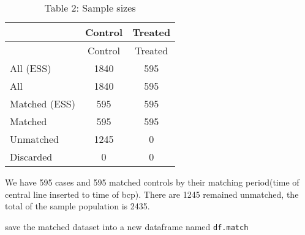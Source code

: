 \documentclass[
]{article}
\newenvironment{Shaded}{\begin{snugshade}}{\end{snugshade}}
\newcommand{\AttributeTok}[1]{\textcolor[rgb]{0.77,0.63,0.00}{#1}}
\newcommand{\DecValTok}[1]{\textcolor[rgb]{0.00,0.00,0.81}{#1}}
\newcommand{\FunctionTok}[1]{\textcolor[rgb]{0.00,0.00,0.00}{#1}}
\newcommand{\NormalTok}[1]{#1}
\newcommand{\OtherTok}[1]{\textcolor[rgb]{0.56,0.35,0.01}{#1}}
\newcommand{\SpecialCharTok}[1]{\textcolor[rgb]{0.00,0.00,0.00}{#1}}
\newcommand{\StringTok}[1]{\textcolor[rgb]{0.31,0.60,0.02}{#1}}
\begin{document}
\begin{Shaded}
\end{Shaded}

\begin{longtable}[]{@{}lcc@{}}
\caption{Table 2: Sample sizes}\tabularnewline
\toprule()
& Control & Treated \\
\midrule()
\endfirsthead
\toprule()
& Control & Treated \\
\midrule()
\endhead
All (ESS) & 1840 & 595 \\
All & 1840 & 595 \\
Matched (ESS) & 595 & 595 \\
Matched & 595 & 595 \\
Unmatched & 1245 & 0 \\
Discarded & 0 & 0 \\
\bottomrule()
\end{longtable}

We have 595 cases and 595 matched controls by their matching period(time
of central line inserted to time of bcp). There are 1245 remained
unmatched, the total of the sample population is 2435.

save the matched dataset into a new dataframe named \texttt{df.match}
\end{document}
